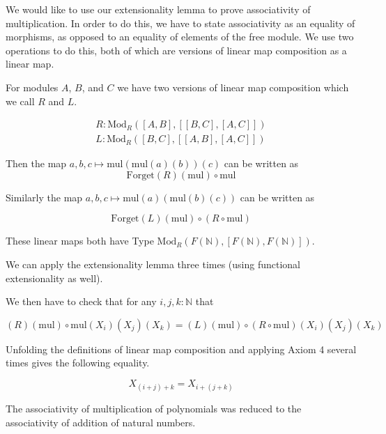 \documentclass[12pt]{article} %
\theoremstyle{definition}
\theoremstyle{definition}
\theoremstyle{definition}
\theoremstyle{definition}
\begin{document}
We would like to use our extensionality lemma to prove associativity of multiplication.
In order to do this, we have to state associativity as an equality of morphisms,
as opposed to an equality of elements of the free module. We use two operations
to do this, both of which are versions of linear map composition as a linear map.

For modules $A$, $B$, and $C$ we have two versions of linear map 
composition which we call $R$ and $L$.

\begin{equation}
  \begin{aligned}
    R : \text{Mod}_R([A, B], [[B,C],[A,C]]) \\
     L : \text{Mod}_R([B, C], [[A,B],[A,C]])
  \end{aligned}
\end{equation}

Then the map $a, b, c \mapsto \text{mul} (\text{mul} (a)(b))(c)$ can be written as 
\begin{equation}
  \text{Forget}(R)(\text{mul}) \circ \text{mul}
\end{equation}

Similarly the map $a, b, c \mapsto \text{mul} (a)(\text{mul} (b)(c))$ can be written as

\begin{equation}
  \text{Forget}(L) (\text{mul}) \circ (R \circ \text{mul})
\end{equation}

These linear maps both have Type $\text{Mod}_R(F(\mathbb{N}), [F(\mathbb{N}), F(\mathbb{N})])$.

We can apply the extensionality lemma three times (using functional extensionality as well).

We then have to check that for any $i, j, k : \mathbb{N}$ that

\begin{equation}
  (R)(\text{mul}) \circ \text{mul}(X_i)(X_j)(X_k) = (L) (\text{mul}) \circ (R \circ \text{mul})(X_i)(X_j)(X_k)
\end{equation}

Unfolding the definitions of linear map composition and applying Axiom 4 several times gives
the following equality.

\begin{equation}
  X_{(i + j) + k} = X_{i + (j + k)}
\end{equation}

The associativity of multiplication of polynomials was reduced to the associativity of addition
of natural numbers.
\end{document}
